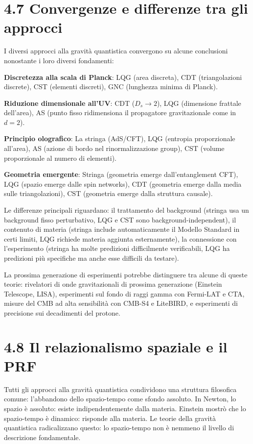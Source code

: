 \documentclass[11.5pt,a4paper,openany]{book}
\theoremstyle{remark}
\begin{document}
\section{4.7 Convergenze e differenze tra gli approcci}

I diversi approcci alla gravità quantistica convergono su alcune conclusioni nonostante i loro diversi fondamenti:

\textbf{Discretezza alla scala di Planck}: LQG (area discreta), CDT (triangolazioni discrete), CST (elementi discreti), GNC (lunghezza minima di Planck).

\textbf{Riduzione dimensionale all'UV}: CDT ($D_s \to 2$), LQG (dimensione frattale dell'area), AS (punto fisso ridimensiona il propagatore gravitazionale come in $d=2$).

\textbf{Principio olografico}: La stringa (AdS/CFT), LQG (entropia proporzionale all'area), AS (azione di bordo nel rinormalizzazione group), CST (volume proporzionale al numero di elementi).

\textbf{Geometria emergente}: Stringa (geometria emerge dall'entanglement CFT), LQG (spazio emerge dalle spin networks), CDT (geometria emerge dalla media sulle triangolazioni), CST (geometria emerge dalla struttura causale).

Le differenze principali riguardano: il trattamento del background (stringa usa un background fisso perturbativo, LQG e CST sono background-independent), il contenuto di materia (stringa include automaticamente il Modello Standard in certi limiti, LQG richiede materia aggiunta esternamente), la connessione con l'esperimento (stringa ha molte predizioni difficilmente verificabili, LQG ha predizioni più specifiche ma anche esse difficili da testare).

La prossima generazione di esperimenti potrebbe distinguere tra alcune di queste teorie: rivelatori di onde gravitazionali di prossima generazione (Einstein Telescope, LISA), esperimenti sul fondo di raggi gamma con Fermi-LAT e CTA, misure del CMB ad alta sensibilità con CMB-S4 e LiteBIRD, e esperimenti di precisione sui decadimenti del protone.

\section{4.8 Il relazionalismo spaziale e il PRF}

Tutti gli approcci alla gravità quantistica condividono una struttura filosofica comune: l'abbandono dello spazio-tempo come sfondo assoluto. In Newton, lo spazio è assoluto: esiste indipendentemente dalla materia. Einstein mostrò che lo spazio-tempo è dinamico: risponde alla materia. Le teorie della gravità quantistica radicalizzano questo: lo spazio-tempo non è nemmeno il livello di descrizione fondamentale.
\end{document}
